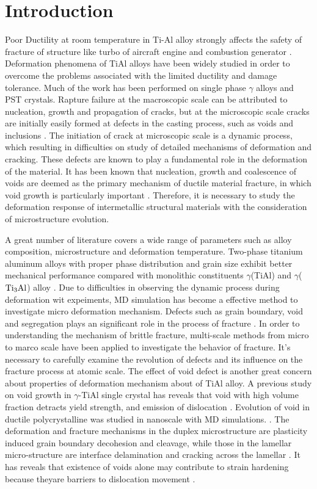 \documentclass[materials,article,submit,moreauthors,pdftex,10pt,a4paper]{Definitions/mdpi}
\begin{document}
\section{Introduction}
Poor Ductility at room temperature in Ti-Al alloy strongly affects the safety of fracture of structure like turbo of aircraft engine and combustion generator \cite{Munz2017}. Deformation phenomena of TiAl alloys have been widely studied in order to overcome the problems associated with the limited ductility and damage tolerance.  Much of the work has been performed on single phase $\gamma$ alloys and PST crystals\cite{Appel2016}. Rapture failure at the macroscopic scale can be attributed to nucleation, growth and propagation of cracks, but at the microscopic scale cracks are initially easily formed at defects in the casting process, such as voids and inclusions \cite{Tang2014}. The initiation of crack at microscopic scale is a dynamic process, which resulting in difficulties on study of detailed mechanisms of deformation and cracking. These defects are known to play a fundamental role in the deformation of the material. It has been known that nucleation, growth and coalescence of voids are deemed as the primary mechanism of ductile material fracture, in which void growth is particularly important \cite{Hempel2017a}. Therefore, it is necessary to study the deformation response of intermetallic structural materials with the consideration of microstructure evolution.

A great number of literature covers a wide range of parameters such as alloy composition, microstructure and deformation temperature. Two-phase titanium aluminum alloys with proper phase distribution and grain size exhibit better mechanical performance compared with monolithic constituents $\gamma$(TiAl) and $\gamma$($\rm Ti_3Al$) alloy \cite{Kim1995}. Due to difficulties in observing the dynamic process during deformation wit expeiments, MD simulation has become a effective method to investigate micro deformation mechanism. Defects such as grain boundary, void and segregation plays an significant role in the process of fracture \cite{Larsen2016}. In order to understanding the mechanism of brittle fracture, multi-scale methods from micro to marco scale have been applied to investigate the behavior of fracture. It's necessary to carefully examine the revolution of defects and its influence on the fracture process at atomic scale. The effect of void defect is another great concern about properties of deformation mechanism about of TiAl alloy. A previous study on void growth in $\gamma$-TiAl single crystal has reveals that void with high volume fraction detracts yield strength, and emission of dislocation \cite{Tang2014,Xu2015}. Evolution of void in ductile polycrystalline was studied in nanoscale with MD simulations. \cite{Jing2018a,Elkhateeb2018}. The deformation and fracture mechanisms in the duplex microstructure are plasticity induced grain boundary decohesion and cleavage, while those in the lamellar micro-structure are interface delamination and cracking across the lamellar \cite{Tang2014}. It has reveals that existence of voids alone may contribute to strain hardening because theyare barriers to dislocation movement \cite{Xiong2015}. 
\end{document}
